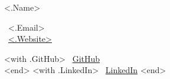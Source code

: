 \begin{minipage}[t][0.8cm][c]{.45\textwidth}
{\centering \fontsize{36pt}{42pt}\selectfont <.Name>}
\end{minipage}
\begin{minipage}[t][0.8cm][c]{0.32\textwidth}
{
    \fontsize{14}{18}\selectfont
    \faEnvelope \ <.Email>
    \vspace{6 pt}\\
    \faGlobe \ \href{https://<.Website>}{<.Website>}
}
\end{minipage}
\begin{minipage}[t][0.8cm][c]{0.30\textwidth}
{
    \fontsize{14}{18}\selectfont
    <with .GitHub> \faGithub \ \href{https://github.com/<.>}{GitHub} \vspace{6 pt}\\ <end>
    <with .LinkedIn> \faLinkedin \ \href{https://linkedin.com/in/<.>}{LinkedIn} <end>
}
\end{minipage}
\vspace{6 pt}\\
\noindent\makebox[\linewidth]{\rule{\paperwidth}{0.4pt}}
\vspace{6 pt}\\